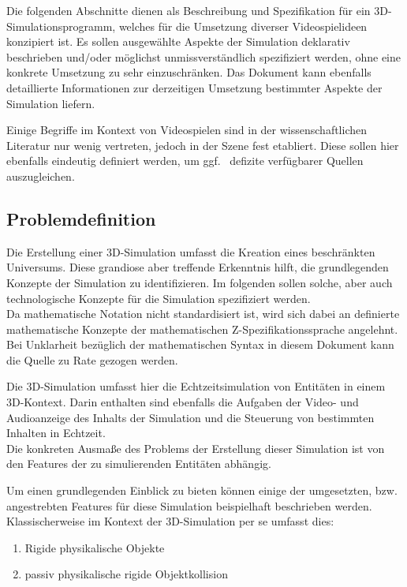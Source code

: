 
Die folgenden Abschnitte dienen als Beschreibung und Spezifikation für ein 3D-Simulationsprogramm, welches für die Umsetzung diverser Videospielideen konzipiert ist.
Es sollen ausgewählte Aspekte der Simulation deklarativ beschrieben und/oder möglichst unmissverständlich spezifiziert werden, ohne eine konkrete Umsetzung zu sehr einzuschränken.
Das Dokument kann ebenfalls detaillierte Informationen zur derzeitigen Umsetzung bestimmter Aspekte der Simulation liefern.

Einige Begriffe im Kontext von Videospielen sind in der wissenschaftlichen Literatur nur wenig vertreten, jedoch in der Szene fest etabliert. Diese sollen hier ebenfalls eindeutig definiert werden, um ggf.~ defizite verfügbarer Quellen auszugleichen.

\subsection{Problemdefinition}
Die Erstellung einer 3D-Simulation umfasst die Kreation eines beschränkten Universums. Diese grandiose aber treffende Erkenntnis hilft, die grundlegenden Konzepte der Simulation zu identifizieren. Im folgenden sollen solche, aber auch technologische Konzepte für die Simulation spezifiziert werden.\\
Da mathematische Notation nicht standardisiert ist, wird sich dabei an definierte mathematische Konzepte der mathematischen Z-Spezifikationssprache angelehnt. Bei Unklarheit bezüglich der mathematischen Syntax in diesem Dokument kann die Quelle \cite{Z} zu Rate gezogen werden. 

Die 3D-Simulation umfasst hier die Echtzeitsimulation von Entitäten in einem 3D-Kontext. Darin enthalten sind ebenfalls die Aufgaben der Video- und Audioanzeige des Inhalts der Simulation und die Steuerung von bestimmten Inhalten in Echtzeit.\\
Die konkreten Ausmaße des Problems der Erstellung dieser Simulation ist von den Features der zu simulierenden Entitäten abhängig.

Um einen grundlegenden Einblick zu bieten können einige der umgesetzten, bzw. angestrebten Features für diese Simulation beispielhaft beschrieben werden.\\
Klassischerweise im Kontext der 3D-Simulation per se umfasst dies:
\begin{enumerate}
\item Rigide physikalische Objekte
\item passiv physikalische rigide Objektkollision
\end{enumerate}

